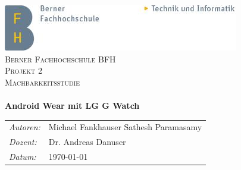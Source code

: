 \begin{titlepage}
\begin{center}

\includegraphics{images/BFH_TI_DE}\\[4cm]

\textsc{\huge Berner Fachhochschule BFH}\\[1.5cm]
\textsc{\LARGE Projekt 2}\\[0.2cm]
\textsc{\LARGE Machbarkeitsstudie}\\[0.5cm]

\HRule\\[0.5cm]
{\huge \bfseries Android Wear mit LG G Watch}\\[0.2cm]
\HRule
\vfill

\renewcommand{\arraystretch}{1.2}
\begin{tabular}{p{2cm}p{4cm}}
\emph{Autoren:} & Michael Fankhauser \newline 
					Sathesh Paramasamy\\
\emph{Dozent:} & Dr. Andreas Danuser\\
\emph{Datum:} & \today
\end{tabular}

\end{center}
\end{titlepage}